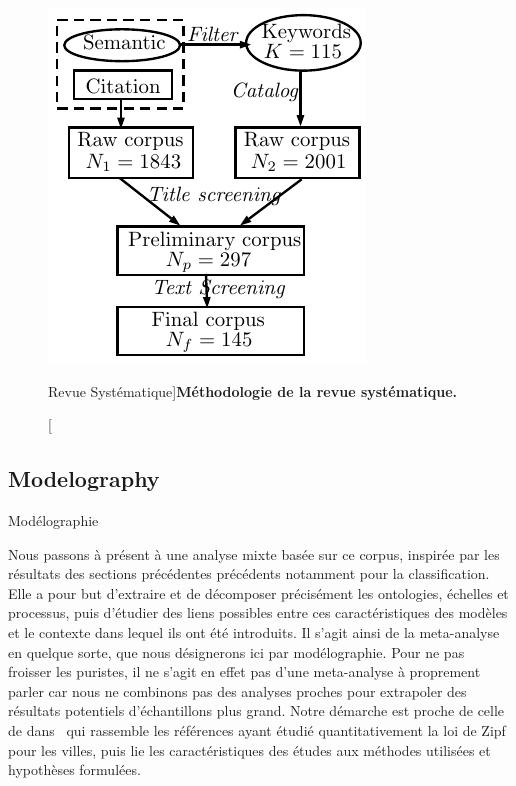 \begin{figure}[h!]
\includegraphics[width=\textwidth]{Figures/Modelography/systematicreview}
\caption[Systematic Review][Revue Systématique]{\label{fig:modelography:systematicreview}}{\textbf{Méthodologie de la revue systématique.}\label{fig:modelography:systematicreview}}
\end{figure}




\subsection{Modelography}{Modélographie}


Nous passons à présent à une analyse mixte basée sur ce corpus, inspirée par les résultats des sections précédentes précédents notamment pour la classification. Elle a pour but d'extraire et de décomposer précisément les ontologies, échelles et processus, puis d'étudier des liens possibles entre ces caractéristiques des modèles et le contexte dans lequel ils ont été introduits. Il s'agit ainsi de la meta-analyse en quelque sorte, que nous désignerons ici par modélographie. Pour ne pas froisser les puristes, il ne s'agit en effet pas d'une meta-analyse à proprement parler car nous ne combinons pas des analyses proches pour extrapoler des résultats potentiels d'échantillons plus grand. Notre démarche est proche de celle de  dans~\cite{2016arXiv160606162C} qui rassemble les références ayant étudié quantitativement la loi de Zipf pour les villes, puis lie les caractéristiques des études aux méthodes utilisées et hypothèses formulées.



